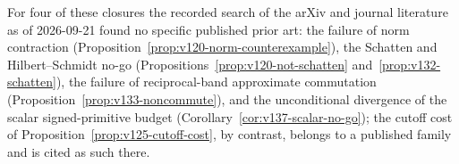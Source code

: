 For four of these closures the recorded search of the arXiv and journal literature
as of 2026-09-21 found no specific published prior art: the failure of
norm contraction (Proposition~\ref{prop:v120-norm-counterexample}), the
Schatten and Hilbert--Schmidt no-go
(Propositions~\ref{prop:v120-not-schatten} and~\ref{prop:v132-schatten}),
the failure of reciprocal-band approximate commutation
(Proposition~\ref{prop:v133-noncommute}), and the unconditional
divergence of the scalar signed-primitive budget
(Corollary~\ref{cor:v137-scalar-no-go}); the cutoff cost of
Proposition~\ref{prop:v125-cutoff-cost}, by contrast, belongs to a
published family and is cited as such there.
